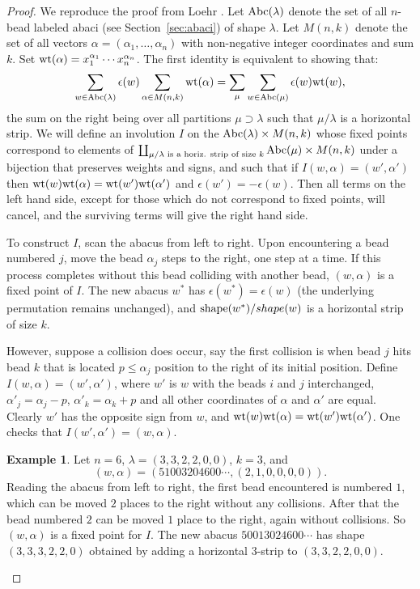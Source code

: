 \documentclass[11pt]{amsart}
\theoremstyle{definition}
\theoremstyle{example}
\newtheorem{example}[theorem]{Example}
\newcommand{\wt}{\textup{wt}}
\newcommand{\shape}{\textup{shape}}
\newcommand{\abc}{\textup{Abc}}
\begin{document}
\begin{proof}
  We reproduce the proof from Loehr \cite{loehr}. 
  Let $\abc(\lambda)$ denote the set of all $n$-bead labeled abaci (see Section~\ref{sec:abaci}) of shape $\lambda$.
  Let $M(n,k)$ denote the set of all vectors $\alpha=(\alpha_1,\dots,\alpha_n)$ with non-negative integer coordinates and sum $k$.
  Set $\wt(\alpha)=x_1^{\alpha_1}\dotsb x_n^{\alpha_n}$.
  The first identity is equivalent to showing that:
  \begin{displaymath}
    \sum_{w\in \abc(\lambda)} \epsilon(w)\sum_{\alpha\in M(n,k)} \wt(\alpha) = \sum_\mu \sum_{w\in \abc(\mu)} \epsilon(w) \wt(w),
  \end{displaymath}
  the sum on the right being over all partitions $\mu\supset\lambda$ such that $\mu/\lambda$ is a horizontal strip.
  We will define an involution $I$ on the $\abc(\lambda)\times M(n,k)$ whose fixed points correspond to elements of $\coprod_{\mu/\lambda \text{ is a horiz. strip of size $k$}}\abc(\mu)\times M(n,k)$ under a bijection that preserves weights and signs, and such that if $I(w, \alpha)=(w', \alpha')$ then $\wt(w)\wt(\alpha)=\wt(w')\wt(\alpha')$ and $\epsilon(w') = -\epsilon(w)$.
  Then all terms on the left hand side, except for those which do not correspond to fixed points, will cancel, and the surviving terms will give the right hand side.

  To construct $I$, scan the abacus from left to right.
  Upon encountering a bead numbered $j$, move the bead $\alpha_j$ steps to the right, one step at a time.
  If this process completes without this bead colliding with another bead, $(w,\alpha)$ is a fixed point of $I$.
  The new abacus $w^*$ has $\epsilon(w^*)=\epsilon(w)$ (the underlying permutation remains unchanged), and $\shape(w^*)/shape(w)$ is a horizontal strip of size $k$.

  However, suppose a collision does occur, say the first collision is when bead $j$ hits bead $k$ that is located $p\leq \alpha_j$ position to the right of its initial position.
  Define $I(w,\alpha) = (w',\alpha')$, where $w'$ is $w$ with the beads $i$ and $j$ interchanged, $\alpha'_j=\alpha_j-p$, $\alpha'_k=\alpha_k+p$ and all other coordinates of $\alpha$ and $\alpha'$ are equal.
  Clearly $w'$ has the opposite sign from $w$, and $\wt(w)\wt(\alpha)=\wt(w')\wt(\alpha')$.
  One checks that $I(w',\alpha')=(w,\alpha)$.
  \begin{example}
    \label{example:bead-h}
    Let $n=6$, $\lambda=(3,3,2,2,0,0)$, $k=3$, and
    \begin{displaymath}
      (w, \alpha) = (51003204600\dotsb, (2, 1, 0, 0, 0, 0)). 
    \end{displaymath}
    Reading the abacus from left to right, the first bead encountered is numbered $1$, which can be moved $2$ places to the right without any collisions.
    After that the bead numbered $2$ can be moved $1$ place to the right, again without collisions.
    So $(w,\alpha)$ is a fixed point for $I$.
    The new abacus $50013024600\dotsb$ has shape $(3,3,3,2,2,0)$ obtained by adding a horizontal $3$-strip to $(3, 3, 2, 2, 0, 0)$.


\end{example}
\end{proof}
\end{document}
